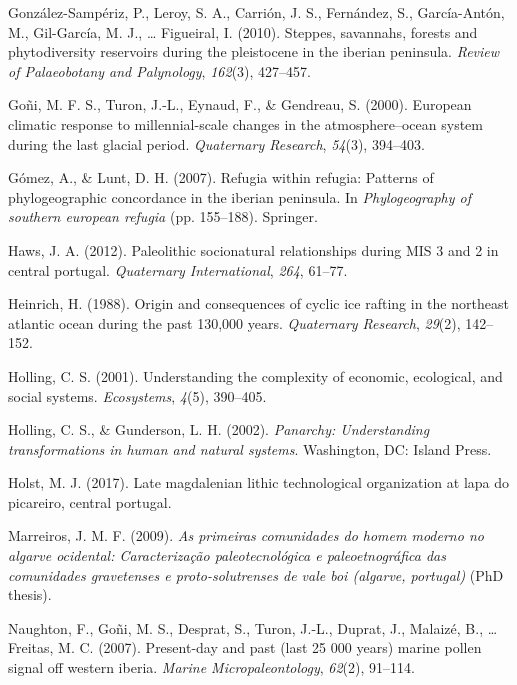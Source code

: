 \documentclass[12pt,twoside]{reedthesis}
\begin{document}
\leavevmode\hypertarget{ref-gonzalez-samperiz2010}{}%
González-Sampériz, P., Leroy, S. A., Carrión, J. S., Fernández, S., García-Antón, M., Gil-García, M. J., \ldots{} Figueiral, I. (2010). Steppes, savannahs, forests and phytodiversity reservoirs during the pleistocene in the iberian peninsula. \emph{Review of Palaeobotany and Palynology}, \emph{162}(3), 427--457.

\leavevmode\hypertarget{ref-goni2000}{}%
Goñi, M. F. S., Turon, J.-L., Eynaud, F., \& Gendreau, S. (2000). European climatic response to millennial-scale changes in the atmosphere--ocean system during the last glacial period. \emph{Quaternary Research}, \emph{54}(3), 394--403.

\leavevmode\hypertarget{ref-gomez2007}{}%
Gómez, A., \& Lunt, D. H. (2007). Refugia within refugia: Patterns of phylogeographic concordance in the iberian peninsula. In \emph{Phylogeography of southern european refugia} (pp. 155--188). Springer.

\leavevmode\hypertarget{ref-haws2012}{}%
Haws, J. A. (2012). Paleolithic socionatural relationships during MIS 3 and 2 in central portugal. \emph{Quaternary International}, \emph{264}, 61--77.

\leavevmode\hypertarget{ref-heinrich1988}{}%
Heinrich, H. (1988). Origin and consequences of cyclic ice rafting in the northeast atlantic ocean during the past 130,000 years. \emph{Quaternary Research}, \emph{29}(2), 142--152.

\leavevmode\hypertarget{ref-holling2001}{}%
Holling, C. S. (2001). Understanding the complexity of economic, ecological, and social systems. \emph{Ecosystems}, \emph{4}(5), 390--405.

\leavevmode\hypertarget{ref-holling2002}{}%
Holling, C. S., \& Gunderson, L. H. (2002). \emph{Panarchy: Understanding transformations in human and natural systems}. Washington, DC: Island Press.

\leavevmode\hypertarget{ref-holst2017}{}%
Holst, M. J. (2017). Late magdalenian lithic technological organization at lapa do picareiro, central portugal.

\leavevmode\hypertarget{ref-marreiros2009}{}%
Marreiros, J. M. F. (2009). \emph{As primeiras comunidades do homem moderno no algarve ocidental: Caracterização paleotecnológica e paleoetnográfica das comunidades gravetenses e proto-solutrenses de vale boi (algarve, portugal)} (PhD thesis).

\leavevmode\hypertarget{ref-naughton2007}{}%
Naughton, F., Goñi, M. S., Desprat, S., Turon, J.-L., Duprat, J., Malaizé, B., \ldots{} Freitas, M. C. (2007). Present-day and past (last 25 000 years) marine pollen signal off western iberia. \emph{Marine Micropaleontology}, \emph{62}(2), 91--114.
\end{document}
